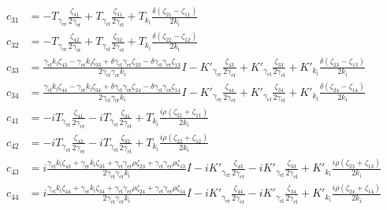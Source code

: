 \begin{align*}
  c_{31} &= -T_{\gamma_\text{er}} \frac{\zeta_{41}}{2 \gamma_\text{er}}+T_{\gamma_\text{el}} \frac{\zeta_{31}}{2 \gamma_\text{el}}+T_{k_\text{i}} \frac{\delta(\zeta_{21}-\zeta_{11})}{2 k_\text{i}} \\
  c_{32} &= -T_{\gamma_\text{er}} \frac{\zeta_{42}}{2 \gamma_\text{er}}+T_{\gamma_\text{el}} \frac{\zeta_{32}}{2 \gamma_\text{el}}+T_{k_\text{i}} \frac{\delta(\zeta_{22}-\zeta_{12})}{2 k_\text{i}} \\
  c_{33} &= \frac{\gamma_\text{el} k_\text{i} \zeta_{43}-\gamma_\text{er} k_\text{i} \zeta_{33}+\delta \gamma_\text{el} \gamma_\text{er} \zeta_{23}-\delta \gamma_\text{el} \gamma_\text{er} \zeta_{13}}{2 \gamma_\text{el} \gamma_\text{er} k_\text{i}} I-K'_{\gamma_\text{er}} \frac{\zeta_{43}}{2 \gamma_\text{er}}+K'_{\gamma_\text{el}} \frac{\zeta_{33}}{2 \gamma_\text{el}}+K'_{k_\text{i}} \frac{\delta(\zeta_{23}-\zeta_{13})}{2 k_\text{i}} \\
  c_{34} &= \frac{\gamma_\text{el} k_\text{i} \zeta_{44}-\gamma_\text{er} k_\text{i} \zeta_{34}+\delta \gamma_\text{el} \gamma_\text{er} \zeta_{24}-\delta \gamma_\text{el} \gamma_\text{er} \zeta_{14}}{2 \gamma_\text{el} \gamma_\text{er} k_\text{i}} I-K'_{\gamma_\text{er}} \frac{\zeta_{44}}{2 \gamma_\text{er}}+K'_{\gamma_\text{el}} \frac{\zeta_{34}}{2 \gamma_\text{el}}+K'_{k_\text{i}} \frac{\delta(\zeta_{24}-\zeta_{14})}{2 k_\text{i}} \\
  c_{41} &= -i T_{\gamma_\text{er}} \frac{\zeta_{41}}{2 \gamma_\text{er}}-i T_{\gamma_\text{el}} \frac{\zeta_{31}}{2 \gamma_\text{el}}+T_{k_\text{i}} \frac{i\rho (\zeta_{21}+\zeta_{11})}{2 k_\text{i}} \\
  c_{42} &= -i T_{\gamma_\text{er}} \frac{\zeta_{42}}{2 \gamma_\text{er}}-i T_{\gamma_\text{el}} \frac{\zeta_{32}}{2 \gamma_\text{el}}+T_{k_\text{i}} \frac{i\rho (\zeta_{22}+\zeta_{12})}{2 k_\text{i}} \\
  c_{43} &= i\frac{\gamma_\text{el} k_\text{i} \zeta_{43}+\gamma_\text{er} k_\text{i} \zeta_{33}+\gamma_\text{el} \gamma_\text{er} \rho \zeta_{23}+\gamma_\text{el} \gamma_\text{er} \rho \zeta_{13}}{2 \gamma_\text{el} \gamma_\text{er} k_\text{i}} I-i K'_{\gamma_\text{er}} \frac{\zeta_{43}}{2 \gamma_\text{er}}-i K'_{\gamma_\text{el}} \frac{\zeta_{33}}{2 \gamma_\text{el}}+K'_{k_\text{i}} \frac{i\rho(\zeta_{23}+\zeta_{13})}{2 k_\text{i}} \\
  c_{44} &= i\frac{\gamma_\text{el} k_\text{i} \zeta_{44}+\gamma_\text{er} k_\text{i} \zeta_{34}+\gamma_\text{el} \gamma_\text{er} \rho \zeta_{24}+\gamma_\text{el} \gamma_\text{er} \rho \zeta_{14}}{2 \gamma_\text{el} \gamma_\text{er} k_\text{i}} I-i K'_{\gamma_\text{er}} \frac{\zeta_{44}}{2 \gamma_\text{er}}-i K'_{\gamma_\text{el}} \frac{\zeta_{34}}{2 \gamma_\text{el}}+K'_{k_\text{i}} \frac{i \rho(\zeta_{24}+\zeta_{14})}{2 k_\text{i}} \\
\end{align*}
